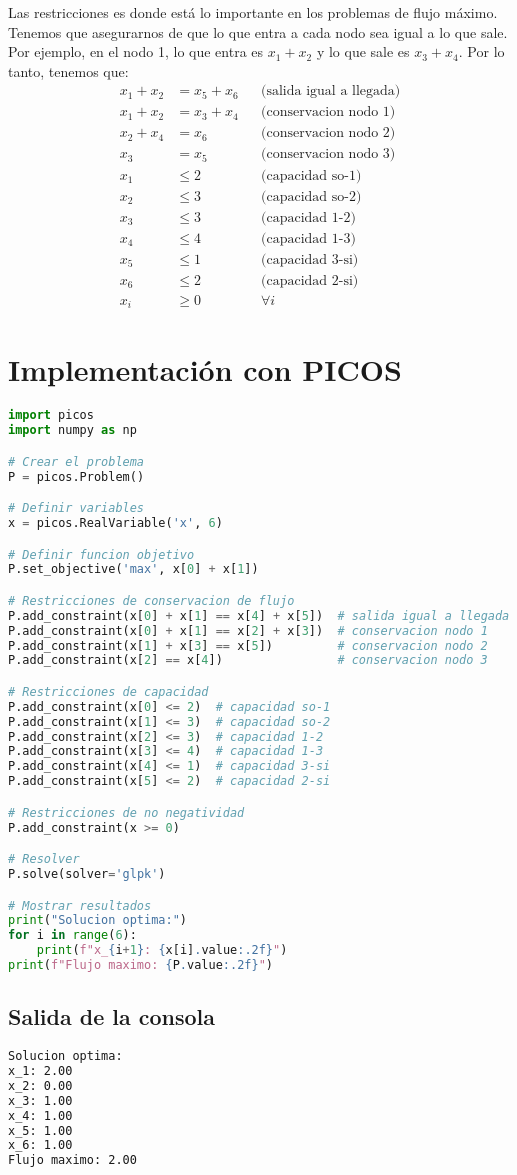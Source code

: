 \documentclass[12pt]{article}
\begin{document}
Las restricciones es donde está lo importante en los problemas de flujo máximo. Tenemos que asegurarnos de que lo que entra a cada nodo sea igual a lo que sale. Por ejemplo, en el nodo 1, lo que entra es $x_1 + x_2$ y lo que sale es $x_3 + x_4$. Por lo tanto, tenemos que:
\begin{align*}
x_1 + x_2 &= x_5 + x_6 && \text{(salida igual a llegada)} \\
x_1 + x_2 &= x_3 + x_4 && \text{(conservacion nodo 1)} \\
x_2 + x_4 &= x_6 && \text{(conservacion nodo 2)} \\
x_3 &= x_5 && \text{(conservacion nodo 3)} \\
x_1 &\leq 2 && \text{(capacidad so-1)} \\
x_2 &\leq 3 && \text{(capacidad so-2)} \\
x_3 &\leq 3 && \text{(capacidad 1-2)} \\
x_4 &\leq 4 && \text{(capacidad 1-3)} \\
x_5 &\leq 1 && \text{(capacidad 3-si)} \\
x_6 &\leq 2 && \text{(capacidad 2-si)} \\
x_i &\geq 0 && \forall i
\end{align*}

\section{Implementación con PICOS}

\begin{lstlisting}[language=Python]
import picos
import numpy as np

# Crear el problema
P = picos.Problem()

# Definir variables
x = picos.RealVariable('x', 6)

# Definir funcion objetivo
P.set_objective('max', x[0] + x[1])

# Restricciones de conservacion de flujo
P.add_constraint(x[0] + x[1] == x[4] + x[5])  # salida igual a llegada
P.add_constraint(x[0] + x[1] == x[2] + x[3])  # conservacion nodo 1
P.add_constraint(x[1] + x[3] == x[5])         # conservacion nodo 2
P.add_constraint(x[2] == x[4])                # conservacion nodo 3

# Restricciones de capacidad
P.add_constraint(x[0] <= 2)  # capacidad so-1
P.add_constraint(x[1] <= 3)  # capacidad so-2
P.add_constraint(x[2] <= 3)  # capacidad 1-2
P.add_constraint(x[3] <= 4)  # capacidad 1-3
P.add_constraint(x[4] <= 1)  # capacidad 3-si
P.add_constraint(x[5] <= 2)  # capacidad 2-si

# Restricciones de no negatividad
P.add_constraint(x >= 0)

# Resolver
P.solve(solver='glpk')

# Mostrar resultados
print("Solucion optima:")
for i in range(6):
    print(f"x_{i+1}: {x[i].value:.2f}")
print(f"Flujo maximo: {P.value:.2f}")

\end{lstlisting}

\subsection{Salida de la consola}

\begin{lstlisting}[language=bash,backgroundcolor=\color{black},basicstyle=\color{white}\ttfamily,numbers=none]
Solucion optima:
x_1: 2.00
x_2: 0.00
x_3: 1.00
x_4: 1.00
x_5: 1.00
x_6: 1.00
Flujo maximo: 2.00
\end{lstlisting}
\end{document}
